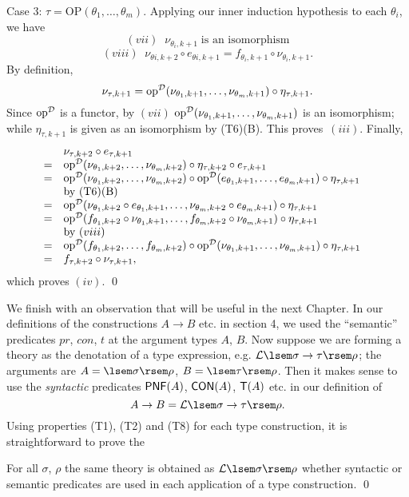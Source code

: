 \noindent Case 3: $\tau = \mbox{OP}(\theta_{1}, \ldots , \theta_{m})$. Applying our inner induction hypothesis to each $\theta_{i}$, we have
\[ (vii) \;\; \nu_{\theta_{i}, k+1} \; \mbox{is an isomorphism} \]
\[ (viii) \;\; \nu_{\theta{i}, k+2} \circ e_{\theta{i}, k+1} = f_{\theta_{i}, k+1} \circ \nu_{\theta_{i}, k+1}. \]
By definition,
\[ \nu_{\tau , k+1} = \mbox{op}^{\cal D}(\nu_{\theta_{1}, k+1}, \ldots , \nu_{\theta_{m}, k+1}) \circ \eta_{\tau , k+1}. \]
Since $\mbox{op}^{\cal D}$ is a functor, by $(vii)$ $\mbox{op}^{\cal D}(\nu_{\theta_{1}, k+1}, \ldots , \nu_{\theta_{m}, k+1})$ is an isomorphism; while $\eta_{\tau , k+1}$ is given as an isomorphism by (T6)(B). 
This proves~$(iii)$. Finally,
\[ \begin{array}{clr}
& \nu_{\tau , k+2} \circ e_{\tau , k+1} & \\
= & \mbox{op}^{\cal D}(\nu_{\theta_{1}, k+2}, \ldots , \nu_{\theta_{m}, k+2}) \circ \eta_{\tau , k+2} \circ e_{\tau , k+1} & \\
= & \mbox{op}^{\cal D}(\nu_{\theta_{1}, k+2}, \ldots , \nu_{\theta_{m}, k+2}) \circ \mbox{op}^{\cal D}(e_{\theta_{1}, k+1}, \ldots , e_{\theta_{m}, k+1}) \circ \eta_{\tau , k+1} \\
  & \mbox{by (T6)(B)} \\
= & \mbox{op}^{\cal D}(\nu_{\theta_{1}, k+2} \circ e_{\theta_{1}, k+1}, \ldots , \nu_{\theta_{m}, k+2} \circ e_{\theta_{m}, k+1}) \circ \eta_{\tau , k+1} & \\ 
= & \mbox{op}^{\cal D}(f_{\theta_{1}, k+2} \circ \nu_{\theta_{1}, k+1}, \ldots , f_{\theta_{m}, k+2} \circ \nu_{\theta_{m}, k+1}) \circ \eta_{\tau , k+1} \\
  & \mbox{by $(viii)$}  \\ 
= & \mbox{op}^{\cal D}(f_{\theta_{1}, k+2}, \ldots , f_{\theta_{m}, k+2}) \circ \mbox{op}^{\cal D}(\nu_{\theta_{1}, k+1}, \ldots , \nu_{\theta_{m}, k+1}) \circ \eta_{\tau , k+1} \\
= & f_{\tau , k+2} \circ \nu_{\tau , k+1}, &
\end{array} \] 
which proves $(iv)$. \qed

We finish with an observation that will be useful in the next Chapter. 
In our definitions of the constructions $A \rightarrow B$ etc. in section 4, 
we used the ``semantic'' predicates $pr$, $con$, $t$ at the argument types $A$, $B$. 
Now suppose we are forming a theory as the denotation of a type expression, 
e.g. ${\cal L} \lsem \sigma \rightarrow \tau \rsem \rho$; 
the arguments are $A = \lsem \sigma \rsem \rho$, $B = \lsem \tau \rsem \rho$. 
Then it makes sense to use the {\it syntactic} predicates ${\sf PNF}(A)$, 
${\sf CON}(A)$, 
${\sf T}(A)$ etc. in our definition of 
\[ A \rightarrow B = {\cal L} \lsem \sigma \rightarrow \tau \rsem \rho. \] 
Using properties (T1), (T2) and (T8) for each type construction, 
it is straightforward to prove the

\begin{observation}
\label{obs}
For all $\sigma$, $\rho$ the same theory is obtained as 
${\cal L} \lsem \sigma \rsem \rho$ whether syntactic or semantic predicates are used in each application of a type construction. \qed
\end{observation}
